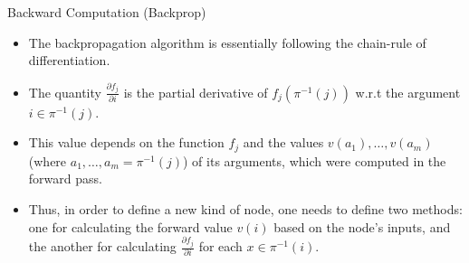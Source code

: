 \documentclass[handout]{beamer}
\begin{document}
\begin{frame}{Backward Computation (Backprop)}
\begin{scriptsize}
\begin{itemize}

\item The backpropagation algorithm is essentially following the chain-rule of differentiation.

\item The quantity  $\frac{\partial f_j}{ \partial i}$ is the partial derivative of $f_j(\pi^{-1}(j))$ w.r.t the argument $i \in \pi^{-1}(j)$.

\item This value depends on the function $f_j$ and the values $v(a_1), \dots, v(a_m)$  (where $a_1, \dots, a_m =  \pi^{-1}(j)$) of its arguments, which were computed in the forward pass.


\item Thus, in order to define a new kind of node, one needs to define two methods: one for calculating the forward value $v(i)$  based on the node's inputs, and the another for calculating  $\frac{\partial f_j}{ \partial i}$ for each $x \in \pi^{-1}(i)$.

\end{itemize}
\end{scriptsize}
\end{frame}
\end{document}
